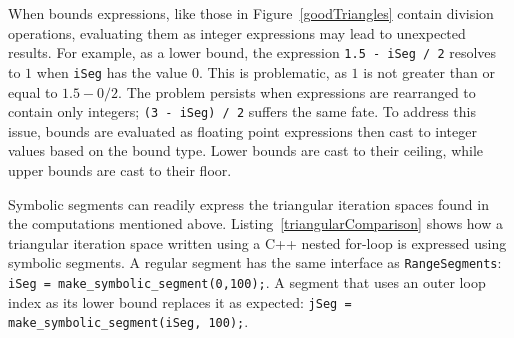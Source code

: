 When bounds expressions, like those in Figure~\ref{goodTriangles} contain division operations, evaluating them as integer expressions may lead to unexpected results. 
For example, as a lower bound, the expression \verb_1.5 - iSeg / 2_ resolves to $1$ when \verb.iSeg. has the value $0$. 
This is problematic, as $1$ is not greater than or equal to $1.5 - 0/2$.
The problem persists when expressions are rearranged to contain only integers; \verb.(3 - iSeg) / 2. suffers the same fate.
To address this issue, bounds are evaluated as floating point expressions then cast to integer values based on the bound type.
Lower bounds are cast to their ceiling, while upper bounds are cast to their floor.

Symbolic segments can readily express the triangular iteration spaces found in the computations mentioned above. 
Listing~\ref{triangularComparison} shows how a triangular iteration space written using a C++ nested for-loop is expressed using symbolic segments.
A regular segment has the same interface as \verb.RangeSegments.: \verb.iSeg = make_symbolic_segment(0,100);..
A segment that uses an outer loop index as its lower bound replaces it as expected: \verb.jSeg = make_symbolic_segment(iSeg, 100);..



